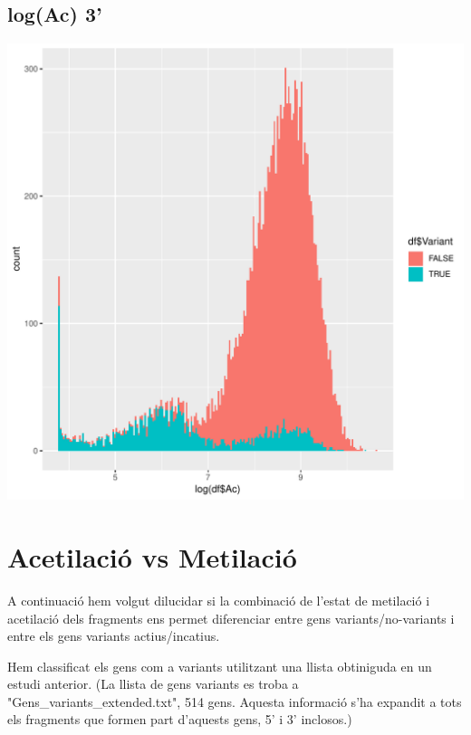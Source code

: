 \documentclass{article}\usepackage[]{graphicx}\usepackage[]{color}
\newenvironment{knitrout}{}{} %
\begin{document}
\subsection{log(Ac) 3'}
\begin{knitrout}
\color{fgcolor}

{\centering \includegraphics[width=1\linewidth]{figure/minimal-dens_3_met-1} 

}



\end{knitrout}
\clearpage

\section{Acetilació vs Metilació}
A continuació hem volgut dilucidar si la combinació de l'estat de metilació i acetilació dels fragments ens permet diferenciar entre gens variants/no-variants i entre els gens variants actius/incatius.

Hem classificat els gens com a variants utilitzant una llista obtiniguda en un estudi anterior. (La llista de gens variants es troba a "Gens\_variants\_extended.txt", 514 gens. Aquesta informació s'ha expandit a tots els fragments que formen part d'aquests gens, 5' i 3' inclosos.)
\clearpage
\end{document}
